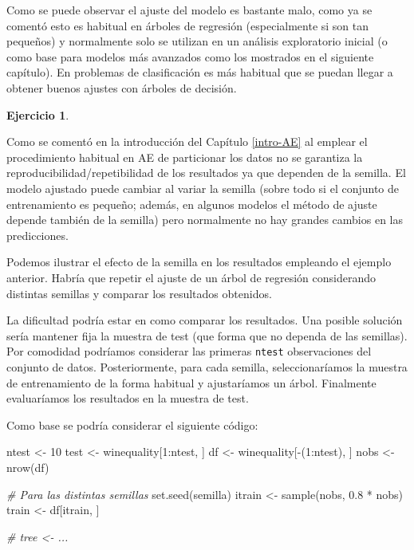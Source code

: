 \documentclass[
  spanish,
]{book}
\newenvironment{Shaded}{\begin{snugshade}}{\end{snugshade}}
\newcommand{\CommentTok}[1]{\textcolor[rgb]{0.56,0.35,0.01}{\textit{#1}}}
\newcommand{\DecValTok}[1]{\textcolor[rgb]{0.00,0.00,0.81}{#1}}
\newcommand{\FloatTok}[1]{\textcolor[rgb]{0.00,0.00,0.81}{#1}}
\newcommand{\FunctionTok}[1]{\textcolor[rgb]{0.00,0.00,0.00}{#1}}
\newcommand{\NormalTok}[1]{#1}
\newcommand{\OtherTok}[1]{\textcolor[rgb]{0.56,0.35,0.01}{#1}}
\newcommand{\SpecialCharTok}[1]{\textcolor[rgb]{0.00,0.00,0.00}{#1}}
\theoremstyle{break}
\theoremstyle{definition}
\theoremstyle{definition}
\theoremstyle{definition}
\newtheorem{exercise}{Ejercicio}[chapter]
\theoremstyle{definition}
\theoremstyle{remark}
\begin{document}
Como se puede observar el ajuste del modelo es bastante malo, como ya se comentó esto es habitual en árboles de regresión (especialmente si son tan pequeños) y normalmente solo se utilizan en un análisis exploratorio inicial (o como base para modelos más avanzados como los mostrados en el siguiente capítulo).
En problemas de clasificación es más habitual que se puedan llegar a obtener buenos ajustes con árboles de decisión.

\begin{exercise}
\protect\hypertarget{exr:efecto-semilla}{}{\label{exr:efecto-semilla} }
\end{exercise}

Como se comentó en la introducción del Capítulo \ref{intro-AE} al emplear el procedimiento habitual en AE de particionar los datos no se garantiza la reproducibilidad/repetibilidad de los resultados ya que dependen de la semilla.
El modelo ajustado puede cambiar al variar la semilla (sobre todo si el conjunto de entrenamiento es pequeño; además, en algunos modelos el método de ajuste depende también de la semilla) pero normalmente no hay grandes cambios en las predicciones.

Podemos ilustrar el efecto de la semilla en los resultados empleando el ejemplo anterior.
Habría que repetir el ajuste de un árbol de regresión considerando distintas semillas y comparar los resultados obtenidos.

La dificultad podría estar en como comparar los resultados.
Una posible solución sería mantener fija la muestra de test (que forma que no dependa de las semillas).
Por comodidad podríamos considerar las primeras \texttt{ntest} observaciones del conjunto de datos.
Posteriormente, para cada semilla, seleccionaríamos la muestra de entrenamiento de la forma habitual y ajustaríamos un árbol. Finalmente evaluaríamos los resultados en la muestra de test.

Como base se podría considerar el siguiente código:

\begin{Shaded}
\begin{Highlighting}[]
\NormalTok{ntest }\OtherTok{\textless{}{-}} \DecValTok{10}
\NormalTok{test }\OtherTok{\textless{}{-}}\NormalTok{ winequality[}\DecValTok{1}\SpecialCharTok{:}\NormalTok{ntest, ]}
\NormalTok{df }\OtherTok{\textless{}{-}}\NormalTok{ winequality[}\SpecialCharTok{{-}}\NormalTok{(}\DecValTok{1}\SpecialCharTok{:}\NormalTok{ntest), ]}
\NormalTok{nobs }\OtherTok{\textless{}{-}} \FunctionTok{nrow}\NormalTok{(df)}

\CommentTok{\# Para las distintas semillas}
\FunctionTok{set.seed}\NormalTok{(semilla)}
\NormalTok{itrain }\OtherTok{\textless{}{-}} \FunctionTok{sample}\NormalTok{(nobs, }\FloatTok{0.8} \SpecialCharTok{*}\NormalTok{ nobs)}
\NormalTok{train }\OtherTok{\textless{}{-}}\NormalTok{ df[itrain, ]}

\CommentTok{\# tree \textless{}{-} ...}
\end{Highlighting}
\end{Shaded}
\end{document}
